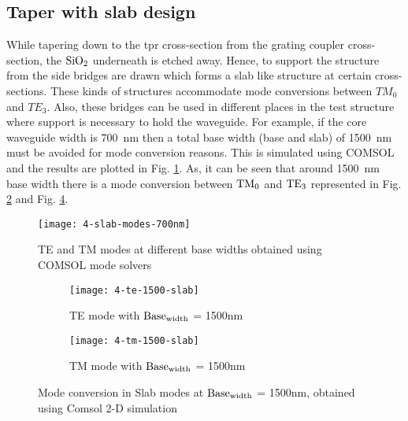 \documentclass[../report.tex]{subfiles}
\begin{document}
\subsection{Taper with slab design}
While tapering down to the \gls{tpr} cross-section from the grating coupler cross-section, the $\mathrm{SiO_{2}}$ underneath is etched away. Hence, to support the structure from the side bridges are drawn which forms a slab like structure at certain cross-sections. These kinds of structures accommodate mode conversions between $TM_0$ and $TE_3$. Also, these bridges can be used in different places in the test structure where support is necessary to hold the waveguide. For example, if the core waveguide width is \SI{700}{\nano\meter} then a total base width (base and slab) of \SI{1500}{\nano\meter} must be avoided for mode conversion reasons. This is simulated using COMSOL and the results are plotted in Fig. \ref{fig:4_slab_modes_700nm}. As, it can be seen that around \SI{1500}{\nano\meter} base width there is a mode conversion between $\mathrm{TM_0}$ and $\mathrm{TE_3}$ represented in Fig. \ref{fig:4_te_1500_slab} and Fig. \ref{fig:4_tm_1500_slab}. 
 
 \begin{figure}[H] %
 	\centering
 	\texttt{[image: 4-slab-modes-700nm]}
 	\caption{TE and TM modes at different base widths obtained using COMSOL mode solvers}
 	\label{fig:4_slab_modes_700nm}
 \end{figure}
 
 \begin{figure}[H] %
 	\begin{subfigure}[t]{0.45\textwidth}
 		\texttt{[image: 4-te-1500-slab]}
 		\caption{TE mode with $\mathrm{Base_{width}}$ = 1500nm}
 		\label{fig:4_te_1500_slab}
 	\end{subfigure}
 	\hfill
 	\begin{subfigure}[t]{0.45\textwidth}
 		\texttt{[image: 4-tm-1500-slab]}
 		\caption{TM mode with $\mathrm{Base_{width}}$ = 1500nm}
 		\label{fig:4_tm_1500_slab}
 	\end{subfigure}
 	\caption{Mode conversion in Slab modes at $\mathrm{Base_{width}}$ = 1500nm, obtained using Comsol 2-D simulation}
 \end{figure}
\end{document}
